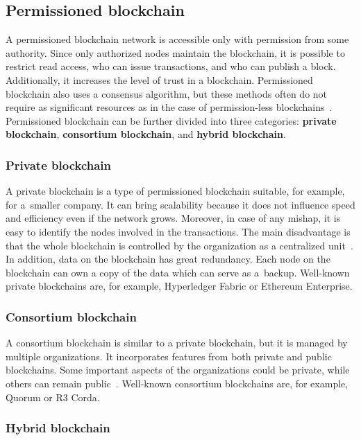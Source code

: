 \subsection{Permissioned blockchain}

A permissioned blockchain network is accessible only with permission from some authority. Since only authorized nodes maintain the blockchain, it is possible to restrict read access, who can issue transactions, and who can publish a block. Additionally, it increases the level of trust in a blockchain. Permissioned blockchain also uses a consensus algorithm, but these methods often do not require as significant resources as in the case of permission-less blockchains~\cite{bc.technology.overview}. Permissioned blockchain can be further divided into three categories: \textbf{private blockchain}, \textbf{consortium blockchain}, and \textbf{hybrid blockchain}. 

\subsubsection{Private blockchain}

A private blockchain is a type of permissioned blockchain suitable, for example, for a~smaller company. It can bring scalability because it does not influence speed and efficiency even if the network grows. Moreover, in case of any mishap, it is easy to identify the nodes involved in the transactions. The main disadvantage is that the whole blockchain is controlled by the organization as a centralized unit~\cite{comprehensive.survey.blockchain}. In addition, data on the blockchain has great redundancy. Each node on the blockchain can own a copy of the data which can serve as a~backup. Well-known private blockchains are, for example, Hyperledger Fabric or Ethereum Enterprise.

\subsubsection{Consortium blockchain}

A consortium blockchain is similar to a private blockchain, but it is managed by multiple organizations. It incorporates features from both private and public blockchains. Some important aspects of the organizations could be private, while others can remain public~\cite{comprehensive.survey.blockchain}. Well-known consortium blockchains are, for example, Quorum or R3 Corda.

\subsubsection{Hybrid blockchain}

